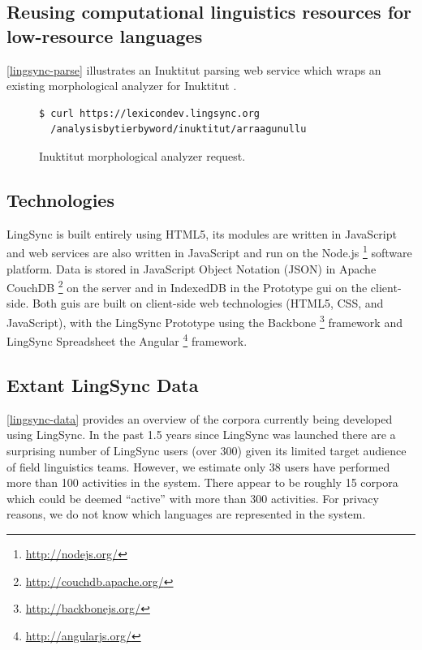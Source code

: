 \documentclass[11pt]{article}
\begin{document}
\subsection{Reusing computational linguistics resources for low-resource languages}

\autoref{lingsync-parse} illustrates an Inuktitut parsing web service which wraps an existing
morphological analyzer for Inuktitut \cite{Farley:2012:Online}.


\begin{figure}[h]
\scriptsize
\begin{verbatim}
$ curl https://lexicondev.lingsync.org
  /analysisbytierbyword/inuktitut/arraagunullu
\end{verbatim}
\normalsize
\caption{Inuktitut morphological analyzer request.}
\label{lingsync-parse}
\end{figure}


\subsection{Technologies}

LingSync is built entirely using HTML5, its modules are written in JavaScript and web services are also written in JavaScript and run on the Node.js%
\footnote{\url{http://nodejs.org/}} %
software platform. Data is stored in JavaScript Object Notation (JSON) in Apache CouchDB%
\footnote{\url{http://couchdb.apache.org/}} %
on the server and in IndexedDB in the Prototype \gls{gui} on the client-side. Both \glspl{gui} are
built on client-side web technologies (HTML5, CSS, and JavaScript), with the LingSync
Prototype using the Backbone%
\footnote{\url{http://backbonejs.org/}} %
framework and LingSync Spreadsheet the Angular%
\footnote{\url{http://angularjs.org/}} %
framework.


\subsection{Extant LingSync Data}

\autoref{lingsync-data} provides an overview of the corpora currently being
developed using LingSync. In the past 1.5 years since LingSync was launched
there are a surprising number of LingSync users (over 300) given its limited
target audience of field linguistics teams. However, we estimate only 38 users
have performed more than 100 activities in the system. There appear to be
roughly 15 corpora which could be deemed ``active'' with more than 300
activities. For privacy reasons, we do not know which languages are represented
in the system.
\end{document}
